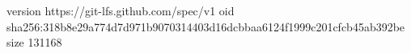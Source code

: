 version https://git-lfs.github.com/spec/v1
oid sha256:318b8e29a774d7d971b9070314403d16dcbbaa6124f1999c201cfcb45ab392be
size 131168

